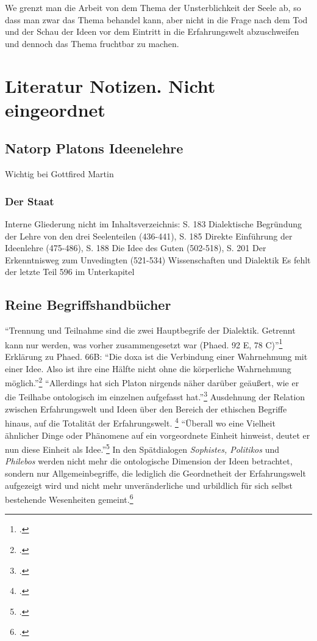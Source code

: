 \documentclass[12pt]{article}
\begin{document}
We grenzt man die Arbeit von dem Thema der Unsterblichkeit der Seele ab, so dass man zwar das Thema behandel kann, aber nicht in die Frage nach dem Tod und der Schau der Ideen vor dem Eintritt in die Erfahrungswelt abzuschweifen und dennoch das Thema fruchtbar zu machen.

\section*{Literatur Notizen. Nicht eingeordnet}
\subsection*{Natorp Platons Ideenelehre}
Wichtig bei Gottfired Martin\nocite{NatorpIdeenlehre}
\subsubsection*{Der Staat}
Interne Gliederung nicht im Inhaltsverzeichnis: S. 183 Dialektische Begründung der Lehre von den drei Seelenteilen (436-441), S. 185 Direkte Einführung der Ideenlehre (475-486), S. 188 Die Idee des Guten (502-518), S. 201 Der Erkenntnisweg zum Unvedingten (521-534) Wissenschaften und Dialektik
Es fehlt der letzte Teil 596 im Unterkapitel



\subsection*{Reine Begriffshandbücher}
\enquote{Trennung und Teilnahme sind die zwei Hauptbegrife der Dialektik. Getrennt kann nur werden, was vorher zusammengesetzt war (Phaed. 92 E, 78 C)}\footcite[][S. 349]{Perls}
Erklärung zu Phaed. 66B: \enquote{Die doxa ist die Verbindung einer Wahrnehmung mit einer Idee. Also ist ihre eine Hälfte nicht ohne die körperliche Wahrnehmung möglich.}\footcite[][S. 350]{Perls}
\enquote{Allerdings hat sich Platon nirgends näher darüber geäußert, wie er die Teilhabe ontologisch im einzelnen aufgefasst hat.}\footcite[][S. 172]{Gigon75}
Ausdehnung der Relation zwischen Erfahrungswelt und Ideen über den Bereich der ethischen Begriffe hinaus, auf die Totalität der Erfahrungswelt. \footcite[vgl.][S. 172]{Gigon75} \enquote{Überall wo eine Vielheit ähnlicher Dinge oder Phänomene auf ein vorgeordnete Einheit hinweist, deutet er nun diese Einheit als Idee.}\footcite[][S. 172]{Gigon75}
In den Spätdialogen \emph{Sophistes, Politikos} und \emph{Philebos} werden nicht mehr die ontologische Dimension der Ideen betrachtet, sondern nur Allgemeinbegriffe, die lediglich die Geordnetheit der Erfahrungswelt aufgezeigt wird und nicht mehr unveränderliche und urbildlich für sich selbst bestehende Wesenheiten gemeint.\footcite[vgl.][S. 174]{Gigon75}
\end{document}
